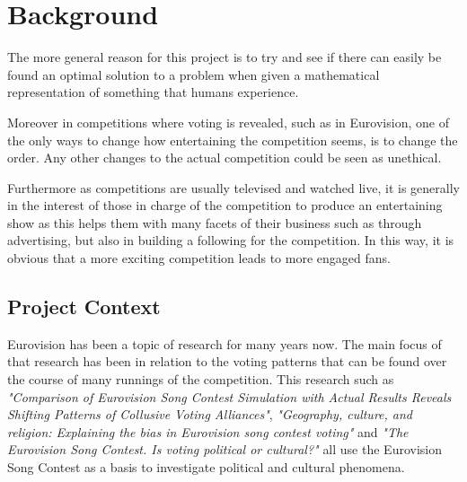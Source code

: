 \documentclass[12pt]{report}
\begin{document}
\section{Background}\label{Background}
The more general reason for this project is to try and see if there can easily be found an optimal solution to a problem when given a mathematical representation of something that humans experience. 

Moreover in competitions where voting is revealed, such as in Eurovision, one of the only ways to change how entertaining the competition seems, is to change the order. Any other changes to the actual competition could be seen as unethical.

Furthermore as competitions are usually televised and watched live, it is generally in the interest of those in charge of the competition to produce an entertaining show as this helps them with many facets of their business such as through advertising, but also in building a following for the competition. In this way, it is obvious that a more exciting competition leads to more engaged fans.

\subsection{Project Context}\label{Project Context}
Eurovision has been a topic of research for many years now. The main focus of that research has been in relation to the voting patterns that can be found over the course of many runnings of the competition. This research such as \textit{"Comparison of Eurovision Song Contest Simulation with Actual Results Reveals Shifting Patterns of Collusive Voting Alliances"}\cite{gatherer2006}, \textit{"Geography, culture, and religion: Explaining the bias in Eurovision song contest voting"}\cite{so66198} and \textit{"The Eurovision Song Contest. Is voting political or cultural?"} \cite{Ginsburgh200841} all use the Eurovision Song Contest as a basis to investigate political and cultural phenomena.
\end{document}
